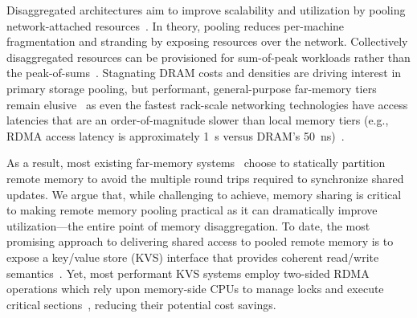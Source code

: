 Disaggregated architectures aim to improve scalability and utilization by
pooling network-attached resources~\cite{dredbox,firebox,blade-server,legoos}.
In theory, pooling reduces per-machine fragmentation and stranding by exposing
resources over the network. Collectively disaggregated resources can be provisioned
for sum-of-peak workloads rather than the peak-of-sums~\cite{dsnf,supernic}.
Stagnating DRAM costs and densities are driving interest in primary storage
pooling, but performant, general-purpose far-memory tiers remain
elusive~\cite{fastswap,3po,kona,infiniswap,hydra,leap,legoos,dilos} as even the
fastest rack-scale networking technologies have access latencies that are an
order-of-magnitude slower than local memory tiers
(e.g., RDMA access latency is approximately 1~{\textmu}s versus DRAM's
50~ns)~\cite{clover}.



As a result, most existing far-memory systems~\cite{kona,mira,aifm,trackfm,carbink} choose to statically partition remote memory to avoid the multiple round trips required to 
synchronize shared updates.
We argue that, while challenging to achieve, memory sharing is
critical to making remote memory pooling practical as it can
dramatically improve utilization---the entire point of memory
disaggregation.  To date, the most promising approach to delivering
shared access to pooled remote memory is to expose a key/value store
(KVS) interface that provides coherent read/write
semantics~\cite{rolex,smart,ditto,fusee,clover,sherman,ford}.  Yet,
most performant KVS systems employ two-sided RDMA operations which rely upon
memory-side CPUs to manage locks and execute critical
sections~\cite{memc3,cuckoo-improvements,pilaf,cell}, reducing their
potential cost savings.

